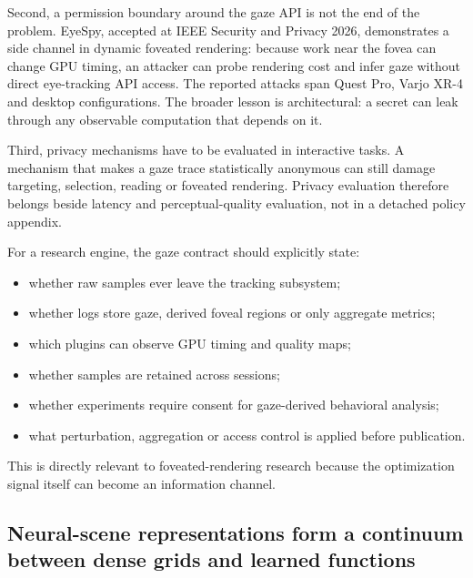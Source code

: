 Second, a permission boundary around the gaze API is not the end of the problem. EyeSpy, accepted at IEEE Security and Privacy 2026, demonstrates a side channel in dynamic foveated rendering: because work near the fovea can change GPU timing, an attacker can probe rendering cost and infer gaze without direct eye-tracking API access. The reported attacks span Quest Pro, Varjo XR-4 and desktop configurations. The broader lesson is architectural: a secret can leak through any observable computation that depends on it.

Third, privacy mechanisms have to be evaluated in interactive tasks. A mechanism that makes a gaze trace statistically anonymous can still damage targeting, selection, reading or foveated rendering. Privacy evaluation therefore belongs beside latency and perceptual-quality evaluation, not in a detached policy appendix.

For a research engine, the gaze contract should explicitly state:

\begin{itemize}
\tightlist
\item
  whether raw samples ever leave the tracking subsystem;
\item
  whether logs store gaze, derived foveal regions or only aggregate metrics;
\item
  which plugins can observe GPU timing and quality maps;
\item
  whether samples are retained across sessions;
\item
  whether experiments require consent for gaze-derived behavioral analysis;
\item
  what perturbation, aggregation or access control is applied before publication.
\end{itemize}

This is directly relevant to foveated-rendering research because the optimization signal itself can become an information channel.

\subsection{Neural-scene representations form a continuum between dense grids and learned functions}\label{04-visual-computing-ii-ch035-neural-scene-representations-form-a-continuum-between-dense-grids-and-learned-functions}

\hypertarget{04-visual-computing-ii-ch035-neural-scene-representations-form-a-continuum-between-dense-grids-and-learned-functions}{}

